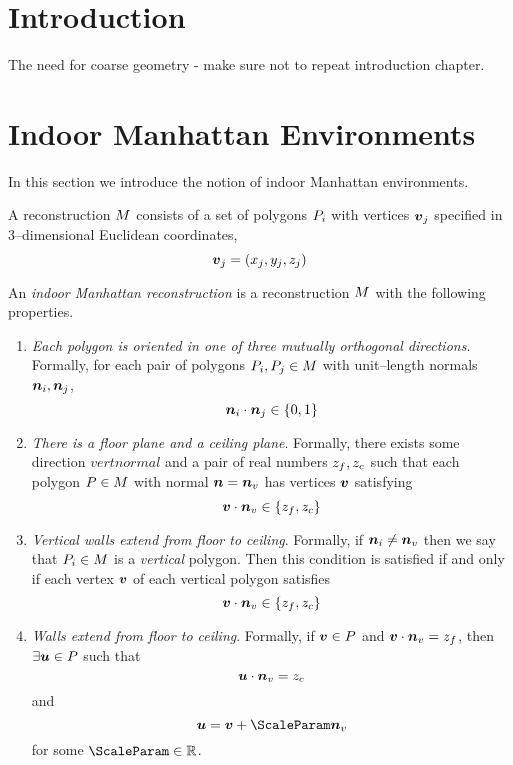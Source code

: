 \section{Introduction}

The need for coarse geometry - make sure not to repeat introduction chapter.

\section{Indoor Manhattan Environments}

In this section we introduce the notion of indoor Manhattan
environments. 

A reconstruction $\Reconstruction$ consists of a set of polygons
$\Poly_i$ with vertices $\vertex_j$ specified in 3--dimensional
Euclidean coordinates,
\begin{equation}
  \vertex_j = (x_j, y_j, z_j)
\end{equation}

An \textit{indoor Manhattan reconstruction} is a reconstruction
$\Reconstruction$ with the following properties.
\begin{enumerate}
\item{\textit{Each polygon is oriented in one of three mutually
    orthogonal directions}. Formally, for each pair of polygons
  $\Poly_i,\Poly_j \in \Reconstruction$ with unit--length normals
  $\normal_i,\normal_j$,
  \begin{equation}
    \normal_i \cdot \normal_j \in \{0,1\}
  \end{equation}
}
\item{\textit{There is a floor plane and a ceiling plane}. Formally,
  there exists some direction $vertnormal$ and a pair of real
  numbers $\zfloor, \zceil$ such that each polygon
  $P\in\Reconstruction$ with normal $\normal=\vertnormal$ has
  vertices $\vertex$ satisfying
  \begin{equation}
    \vertex \cdot \vertnormal \in \{\zfloor, \zceil\}
  \end{equation}
}
\item{\textit{Vertical walls extend from floor to ceiling}. Formally, if
  $\normal_i \neq \vertnormal$ then we say that $\Poly_i \in
  \Reconstruction$ is a \textit{vertical} polygon. Then this
  condition is satisfied if and only if each vertex $\vertex$ of
  each vertical polygon satisfies
  \begin{equation}
    \vertex \cdot \vertnormal \in \{\zfloor, \zceil\}
  \end{equation}
}
\item{\textit{Walls extend from floor to ceiling}. Formally, if
  $\vertex\in\Poly$ and $\vertex\cdot\vertnormal=\zfloor$, then
  $\exists\othervertex\in\Poly$ such that
  \begin{equation}
    \othervertex \cdot \vertnormal = \zceil
  \end{equation}
  and
  \begin{equation}
    \othervertex = \vertex + \ScaleParam \vertnormal
  \end{equation}
  for some $\ScaleParam \in \Reals$.
}
\end{enumerate}

